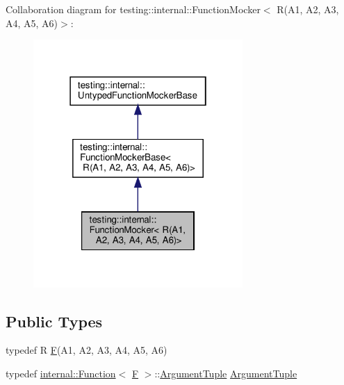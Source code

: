 Collaboration diagram for testing\+:\+:internal\+:\+:Function\+Mocker$<$ R(A1, A2, A3, A4, A5, A6)$>$\+:
\nopagebreak
\begin{figure}[H]
\begin{center}
\leavevmode
\includegraphics[width=226pt]{classtesting_1_1internal_1_1_function_mocker_3_01_r_07_a1_00_01_a2_00_01_a3_00_01_a4_00_01_a5_00_01_a6_08_4__coll__graph}
\end{center}
\end{figure}
\subsection*{Public Types}
\begin{DoxyCompactItemize}
\item 
typedef R \hyperlink{classtesting_1_1internal_1_1_function_mocker_3_01_r_07_a1_00_01_a2_00_01_a3_00_01_a4_00_01_a5_00_01_a6_08_4_a5373cd66051f0a54e83b0497004df058}{F}(A1, A2, A3, A4, A5, A6)
\item 
typedef \hyperlink{structtesting_1_1internal_1_1_function}{internal\+::\+Function}$<$ \hyperlink{classtesting_1_1internal_1_1_function_mocker_3_01_r_07_a1_00_01_a2_00_01_a3_00_01_a4_00_01_a5_00_01_a6_08_4_a5373cd66051f0a54e83b0497004df058}{F} $>$\+::\hyperlink{classtesting_1_1internal_1_1_function_mocker_3_01_r_07_a1_00_01_a2_00_01_a3_00_01_a4_00_01_a5_00_01_a6_08_4_a0c8bc671adc8e67e8a49a01432407139}{Argument\+Tuple} \hyperlink{classtesting_1_1internal_1_1_function_mocker_3_01_r_07_a1_00_01_a2_00_01_a3_00_01_a4_00_01_a5_00_01_a6_08_4_a0c8bc671adc8e67e8a49a01432407139}{Argument\+Tuple}
\end{DoxyCompactItemize}
